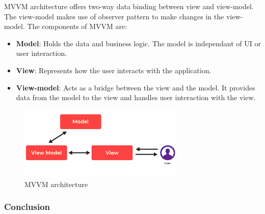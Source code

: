 MVVM architecture offers two-way data binding between view and view-model. The view-model makes use of observer pattern to make changes in the view-model. The components of MVVM are:

\begin{itemize}
    \item \textbf{Model}: Holds the data and business logic. The model is independant of UI or user interaction.
    \item \textbf{View}: Represents how the user interacts with the application.
    \item \textbf{View-model}: Acts as a bridge between the view and the model. It provides data from the model to the view and handles user interaction with the view.
\end{itemize}

\begin{figure}[H]
    \centering
    \includegraphics[width=0.7\textwidth]{assets/images/Research/System/MVVM.png}
    \caption{MVVM architecture}
    \label{fig:mvvm}
\end{figure}

\subsubsection{Conclusion}

